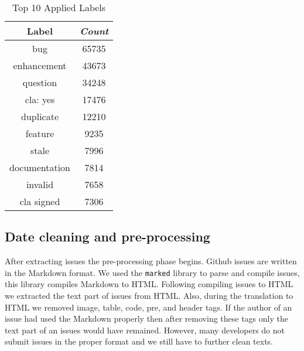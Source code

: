 \documentclass[conference]{IEEEtran}
\begin{document}
\begin{table}[htbp]
  \caption{Top 10 Applied Labels}
  \begin{center}
  \begin{tabular}{|c|c|}
  \hline
  \textbf{Label} & \textbf{\textit{Count}}\\
  \hline
  bug           & 65735 \\
  \hline
  enhancement   & 43673 \\
  \hline
  question      & 34248 \\
  \hline
  cla: yes      & 17476 \\
  \hline
  duplicate     & 12210 \\
  \hline
  feature       & 9235 \\
  \hline
  stale         & 7996 \\
  \hline
  documentation & 7814 \\
  \hline
  invalid       & 7658 \\
  \hline
  cla signed    & 7306 \\
  \hline
  \end{tabular}
  \end{center}
  \label{tab:labels}
\end{table}

\subsection{Date cleaning and pre-processing}
After extracting issues the pre-processing phase begins. Github issues are written in the Markdown format.
We used the \verb|marked| \cite{web:marked} library to parse and compile issues, this library compiles
Markdown to HTML. Following compiling issues to HTML we extracted the text part of issues from HTML.
Also, during the translation to HTML we removed image, table, code, pre, and header tags. If the
author of an issue had used the Markdown properly then after removing these tags only the text part
of an issues would have remained. However, many developers do not submit issues in the proper format and we
still have to further clean texts. 
\end{document}
